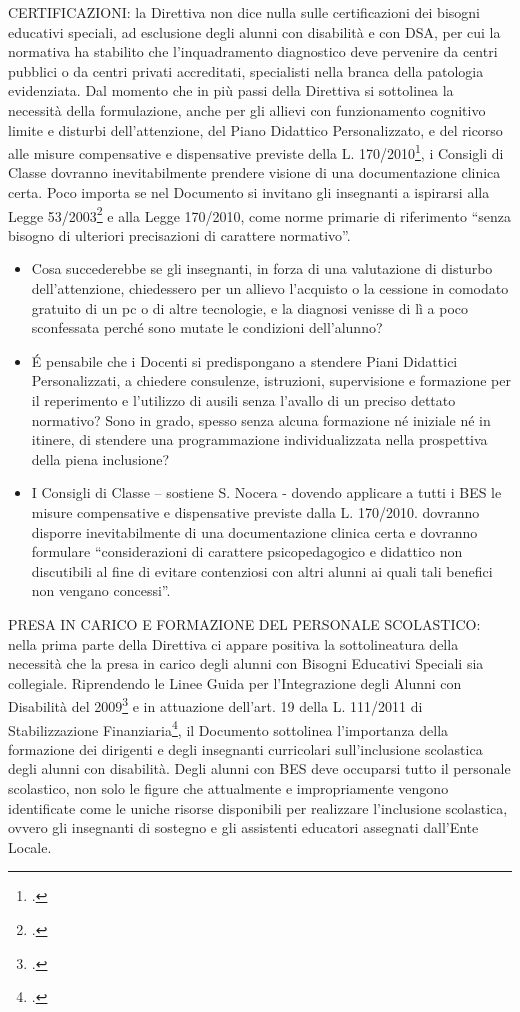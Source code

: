 CERTIFICAZIONI: la Direttiva non dice nulla sulle certificazioni dei bisogni educativi speciali, ad
esclusione degli alunni con disabilità e con DSA, per cui la normativa ha stabilito che
l'inquadramento diagnostico deve pervenire da centri pubblici o da centri privati accreditati,
specialisti nella branca della patologia evidenziata. Dal momento che in più passi della Direttiva si
sottolinea la necessità della formulazione, anche per gli allievi con funzionamento cognitivo
limite e disturbi dell'attenzione, del Piano Didattico Personalizzato, e del ricorso alle misure
compensative e dispensative previste della L. 170/2010\footcite{legge170}, i Consigli di Classe dovranno
inevitabilmente prendere visione di una documentazione clinica certa. Poco importa se nel
Documento si invitano gli insegnanti a ispirarsi alla Legge 53/2003\footcite{Legge_53_2003} e alla Legge 170/2010, come
norme primarie di riferimento “senza bisogno di ulteriori precisazioni di carattere normativo”.
\begin{itemize}
	\item  Cosa succederebbe se gli insegnanti, in forza di una valutazione di disturbo
	dell'attenzione, chiedessero per un allievo l'acquisto o la cessione in comodato
	gratuito di un pc o di altre tecnologie, e la diagnosi venisse di lì a poco sconfessata
	perché sono mutate le condizioni dell'alunno?
	\item \'{E} pensabile che i Docenti si predispongano a stendere Piani Didattici
	Personalizzati, a chiedere consulenze, istruzioni, supervisione e formazione per il
	reperimento e l'utilizzo di ausili senza l'avallo di un preciso dettato normativo?
	Sono in grado, spesso senza alcuna formazione né iniziale né in itinere, di stendere
	una programmazione individualizzata nella prospettiva della piena inclusione?
	\item I Consigli di Classe – sostiene S. Nocera - dovendo applicare a tutti i BES le misure
	compensative e dispensative previste dalla L. 170/2010. dovranno disporre
	inevitabilmente di una documentazione clinica certa e dovranno formulare
	“considerazioni di carattere psicopedagogico e didattico non discutibili al fine di
	evitare contenziosi con altri alunni ai quali tali benefici non vengano concessi”.
\end{itemize}

PRESA IN CARICO E FORMAZIONE DEL PERSONALE SCOLASTICO: nella prima parte della Direttiva
ci appare positiva la sottolineatura della necessità che la presa in carico degli alunni con Bisogni
Educativi Speciali sia collegiale. Riprendendo le Linee Guida per l'Integrazione degli Alunni con
Disabilità del 2009\footcite{LineGuida2009} e in attuazione dell'art. 19 della L. 111/2011 di Stabilizzazione Finanziaria\footcite{legge_111_2011}, il
Documento sottolinea l'importanza della formazione dei dirigenti e degli insegnanti curricolari
sull'inclusione scolastica degli alunni con disabilità. Degli alunni con BES deve occuparsi tutto il
personale scolastico, non solo le figure che attualmente e impropriamente vengono identificate
come le uniche risorse disponibili per realizzare l'inclusione scolastica, ovvero gli insegnanti di
sostegno e gli assistenti educatori assegnati dall'Ente Locale.

